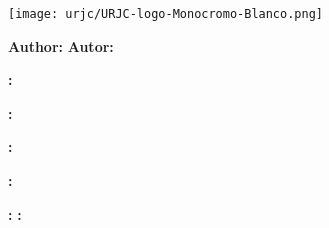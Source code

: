 \large
\vspace{0.5cm}
\begin{center}
	
	\centerline{\texttt{[image: urjc/URJC-logo-Monocromo-Blanco.png]}}
	\vspace{5mm}
  \color{textoHeadingPortadaTFGURJC}
  
  \Large\textbf{\mySchool}
  \vspace{10mm}
  
  \Large\textbf{\MakeUppercase{\myDegreefull}}

  \vspace{15mm}

  \LARGE\textbf{\myWorkTypeFull}
  
  \vspace{5mm}
 
  \LARGE{\MakeUppercase{\myBookTitle}}

  \vspace{3cm}

  {
    \textbf{Author:}  \myAuthorFullName 
  }
  {
    \textbf{Autor:}  \myAuthorFullName 
  }

  \vspace{0.5cm}


  {
    {
      \textbf{\expandafter\makefirstuc\expandafter{\wordAdvisor}:} \myAcademicTutorFullName{}

      \ifthenelse{\equal{\myCoTutorFullName}{}}
      {
      }
      {
        \textbf{\expandafter\makefirstuc\expandafter{\wordCoAdvisor}:} \myCoTutorFullName{}
      }

    }
    {%
      \textbf{\expandafter\makefirstuc\expandafter{\wordTutorOrTutora}:}    \myAcademicTutorFullName{}

      \ifthenelse{\equal{\myCoTutorFullName}{}}
      {
      }
      {
        \textbf{\expandafter\makefirstuc\expandafter{\wordCoTutorOrCoTutora}:} \myCoTutorFullName{}
      }
    }
  }
  {
    {
      \textbf{\expandafter\makefirstuc\expandafter{\wordAdvisorOrAdvisors}:} \myAdvisors
    }
    {
      \textbf{\expandafter\makefirstuc\expandafter{\wordTutorOrTutores}:} \myAdvisors
    }
  }  




\end{center}

